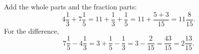 Add the whole parts and the fraction parts:
\[4\dfrac13+7\dfrac15=11+\dfrac13+\dfrac15=11+\dfrac{5+3}{15}=\boxed{11\dfrac8{15}}.\]
For the difference,
\[7\dfrac15-4\dfrac13=3+\dfrac15-\dfrac13=3-\dfrac2{15}=\dfrac{43}{15}=\boxed{2\dfrac{13}{15}}.\]
